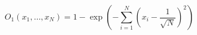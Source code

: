 \documentclass[10pt]{article}
\begin{document}
\[O_{1}\left(x_{1},\hdots,x_{N}\right) = 1 - \exp\left(-\sum_{i=1}^{N}\left(x_{i}-\frac{1}{\sqrt{N}}\right)^2\right)\]
\end{document}
